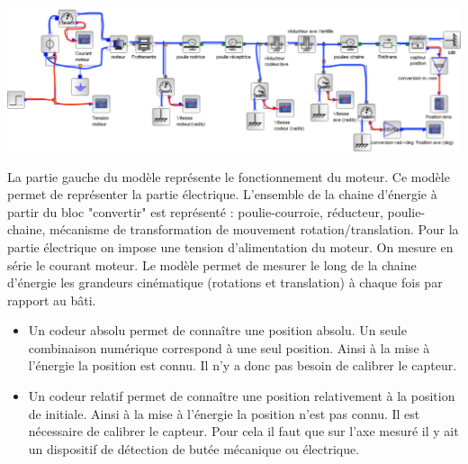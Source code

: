 \ifprof
\begin{corrige}
\begin{center}
\includegraphics[width=1.0\textwidth]{images/image13_corrige.png}
\end{center}
\end{corrige}
\else
\fi



\ifprof
\begin{corrige}
La partie gauche du modèle représente le fonctionnement du moteur. Ce modèle permet de représenter la partie électrique. L'ensemble de la chaine d'énergie à partir du bloc "convertir" est représenté : poulie-courroie, réducteur, poulie-chaine, mécanisme de transformation de mouvement rotation/translation. Pour la partie électrique on impose une tension d'alimentation du moteur. On mesure en série le courant moteur. Le modèle permet de mesurer le long de la chaine d'énergie les grandeurs cinématique (rotations et translation) à chaque fois par rapport au bâti.
\end{corrige}
\else
\fi


\ifprof
\begin{corrige}
\begin{itemize}
\item Un codeur absolu permet de connaître une position absolu. Un seule combinaison numérique correspond à une seul position. Ainsi à la mise à l'énergie la position est connu. Il n'y a donc pas besoin de calibrer le capteur.
\item Un codeur relatif permet de connaître une position relativement à la position de initiale. Ainsi à la mise à l'énergie la position n'est pas connu. Il est nécessaire de calibrer le capteur. Pour cela il faut que sur l'axe mesuré il y ait un dispositif de détection de butée mécanique ou électrique.
\end{itemize}
\end{corrige}
\else
\fi



